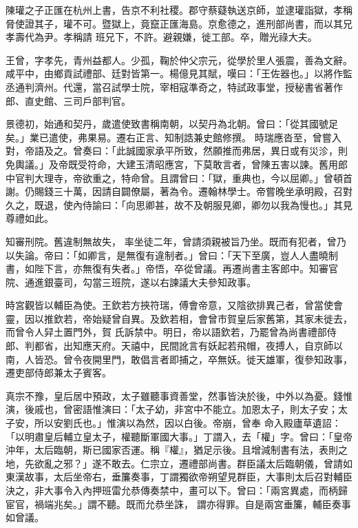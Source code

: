 \begin{pinyinscope}
 陳瓘之子正匯在杭州上書，告京不利社稷。郡守蔡薿執送京師，並逮瓘詣獄，孝稱脅使證其子，瓘不可。暨獄上，竟竄正匯海島。京愈德之，進刑部尚書，而以其兄孝壽代為尹。孝稱請
 班兄下，不許。避親嫌，徙工部。卒，贈光祿大夫。



 王曾，字孝先，青州益都人。少孤，鞠於仲父宗元，從學於里人張震，善為文辭。咸平中，由鄉貢試禮部、廷對皆第一。楊億見其賦，嘆曰：「王佐器也。」以將作監丞通判濟州。代還，當召試學士院，宰相寇準奇之，特試政事堂，授秘書省著作郎、直史館、三司戶部判官。



 景德初，始通和契丹，歲遣使致書稱南朝，以契丹為北朝。曾曰：「從其國號足矣。」業已遣使，弗果易。遷右正言、知制誥兼史館修撰。
 時瑞應沓至，曾嘗入對，帝語及之。曾奏曰：「此誠國家承平所致，然願推而弗居，異日或有災沴，則免輿議。」及帝既受符命，大建玉清昭應宮，下莫敢言者，曾陳五害以諫。舊用郎中官判大理寺，帝欲重之，特命曾。且謂曾曰：「獄，重典也，今以屈卿。」曾頓首謝。仍賜錢三十萬，因請自闢僚屬，著為令。遷翰林學士。帝嘗晚坐承明殿，召對久之，既退，使內侍諭曰：「向思卿甚，故不及朝服見卿，卿勿以我為慢也。」其見尊禮如此。



 知審刑院。舊違制無故失，
 率坐徒二年，曾請須親被旨乃坐。既而有犯者，曾乃以失論。帝曰：「如卿言，是無復有違制者。」曾曰：「天下至廣，豈人人盡曉制書，如陛下言，亦無復有失者。」帝悟，卒從曾議。再遷尚書主客郎中。知審官院、通進銀臺司，勾當三班院，遂以右諫議大夫參知政事。



 時宮觀皆以輔臣為使。王欽若方挾符瑞，傅會帝意，又陰欲排異己者，曾當使會靈，因以推欽若，帝始疑曾自異。及欽若相，會曾市賀皇后家舊第，其家未徙去，而曾令人舁土置門外，賀
 氏訴禁中。明日，帝以語欽若，乃罷曾為尚書禮部侍郎、判都省，出知應天府。天禧中，民間訛言有妖起若飛帽，夜搏人，自京師以南，人皆恐。曾令夜開里門，敢倡言者即捕之，卒無妖。徙天雄軍，復參知政事，遷吏部侍郎兼太子賓客。



 真宗不豫，皇后居中預政，太子雖聽事資善堂，然事皆決於後，中外以為憂。錢惟演，後戚也，曾密語惟演曰：「太子幼，非宮中不能立。加恩太子，則太子安；太子安，所以安劉氏也。」惟演以為然，因以白後。帝崩，曾奉
 命入殿廬草遺詔：「以明肅皇后輔立皇太子，權聽斷軍國大事。」丁謂入，去「權」字。曾曰：「皇帝沖年，太后臨朝，斯已國家否運。稱『權』，猶足示後。且增減制書有法，表則之地，先欲亂之邪？」遂不敢去。仁宗立，遷禮部尚書。群臣議太后臨朝儀，曾請如東漢故事，太后坐帝右，垂簾奏事，丁謂獨欲帝朔望見群臣，大事則太后召對輔臣決之，非大事令入內押班雷允恭傳奏禁中，畫可以下。曾曰：「兩宮異處，而柄歸宦官，禍端兆矣。」謂不聽。既而允恭坐誅，
 謂亦得罪。自是兩宮垂簾，輔臣奏事如曾議。




\end{pinyinscope}
